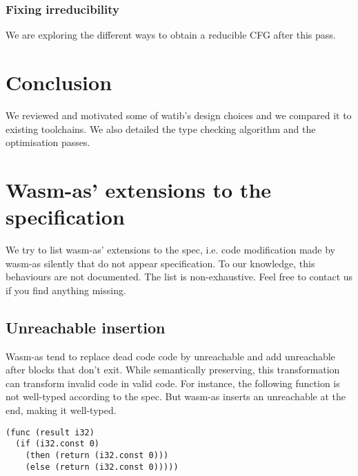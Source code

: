 \documentclass[a4paper,11pt]{article}
\begin{document}
\subsubsection{Fixing irreducibility}
We are exploring the different ways to obtain a reducible CFG after this pass.


\section{Conclusion}
We reviewed and motivated some of \textsf{watib}'s design choices and we
compared it to existing toolchains. We also detailed the type checking algorithm
and the optimisation passes.

\printbibliography
\newpage
\appendix
\section{Wasm-as' extensions to the specification}\label{wasmasex}
We try to list wasm-as' extensions to the spec, i.e. code modification made by
wasm-as silently that do not appear specification. To our knowledge, this
behaviours are not documented. The list is non-exhaustive. Feel free to contact
us if you find anything missing.
\subsection{\textsf{Unreachable} insertion}
Wasm-as tend to replace dead code code by \textsf{unreachable} and add
\textsf{unreachable} after blocks that don't exit. While semantically
preserving, this transformation can transform invalid code in valid code. For
instance, the following function is not well-typed according to the spec. But
wasm-as inserts an \textsf{unreachable} at the end, making it well-typed.
\begin{lstlisting}
(func (result i32)
  (if (i32.const 0)
    (then (return (i32.const 0)))
    (else (return (i32.const 0)))))
\end{lstlisting}
\end{document}
